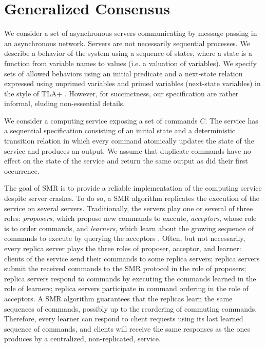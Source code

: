 \begin{comment}
Composable Generalized Consensus is the most complete framework to date for building
adaptive replication algorithms out of heterogeneous rounds, making state of the
art optimization techniques available to algorithm designers, which was not
possible before.
\end{comment}

\section{Generalized Consensus}
\label{sec:gc}

We consider a set of asynchronous servers communicating by message passing in
an asynchronous network. Servers are not necessarily sequential processes.
We describe a behavior of the system using a sequence of states,
where a state is a function from variable names to values (i.e. a valuation of
variables). We specify sets of allowed behaviors using an initial predicate
and a next-state relation expressed using unprimed variables and primed variables (next-state variables) in the
style of TLA+ \cite{Lamport02SpecifyingSystems}. However, for succinctness, our
specification are rather informal, eluding non-essential details.

We consider a computing service exposing a set of commands $C$. The
service has a sequential specification consisting of an initial state
and a deterministic transition relation in which every command
atomically updates the state of the service and produces an output. We
assume that duplicate commands have no effect on the state of the
service and return the same output as did their first occurrence.

The goal of SMR is to provide a reliable implementation of the computing service despite server crashes.
To do so, a SMR algorithm replicates the execution of the service on several servers. 
Traditionally, the servers play one or
several of three roles: \emph{proposers}, which propose new commands to execute,
\emph{acceptors}, whose role is to order commands, and
\emph{learners}, which learn about the growing sequence of commands to
execute by querying the acceptors \cite{lamport2001paxos}. Often, but not necessarily, every replica server plays the
three roles of proposer, acceptor, and learner: clients of the service
send their commands to some replica servers; replica servers submit
the received commands to the SMR protocol in the role of proposers;
replica servers respond to commands by executing the commands learned
in the role of learners; replica servers participate in command
ordering in the role of acceptors.  A SMR algorithm guarantees that
the replicas learn the same sequences of commands, possibly up to the
reordering of commuting commands. Therefore, every learner can respond to client
requests using its last learned sequence of commands, and clients will receive
the same responses as the ones produces by a centralized, non-replicated,
service. 

